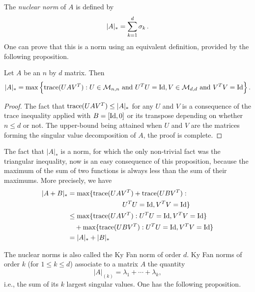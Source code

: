 The {\em nuclear norm} of $A$ is defined by
\[
|A|_* = \sum_{k=1}^d \sigma_k\,.
\]
One can prove that this is a norm using an equivalent definition, provided by the following proposition.
\begin{proposition}
\label{prop:nuclear}
Let $A$ be an $n$ by $d$ matrix. Then
\[
|A|_* = \max\Big\{\trace(UAV^T): U \in \CM_{n,n} \text{ and } U^TU = \Id,  V \in \CM_{d,d} \text{ and } V^TV = \Id\Big\}\,.
\]
\end{proposition}
\begin{proof}
The fact that ${\mathrm{trace}}(UAV^T) \leq |A|_*$ for any $U$ and $V$ is a consequence of the trace inequality applied with $B = [\Id, 0]$ or its transpose depending on whether $n\leq d$ or not. The upper-bound being attained when $U$ and $V$ are the matrices forming the singular value decomposition of $A$, the proof is complete.
\end{proof}
The fact that $|A|_*$ is a norm, for which the only non-trivial fact was the triangular inequality, now is an easy consequence of this proposition, because the maximum of the sum of two functions is always less than the sum of their maximums. 
More precisely, we have
\begin{align*}
|A+B|_* &= \max\{\trace(UAV^T) + \trace(UBV^T):\\
& \qquad \qquad \qquad \qquad U^TU = \Id, V^TV = \Id\}\\
&\leq \max\{\trace(UAV^T): U^TU = \Id, V^TV = \Id\}\\
& \quad + \max\{\trace(UBV^T): U^TU = \Id,  V^TV = \Id\}\\
&= |A|_* + |B|_*
\end{align*}


The nuclear norms is also called the Ky Fan norm of order $d$. Ky Fan norms of order $k$ (for $1\leq k\leq d$) associate to a matrix $A$ the quantity
\[
|A|_{(k)} = \lambda_1 + \cdots + \lambda_k,
\]
i.e., the sum of its $k$ largest singular values. One has the following proposition.


